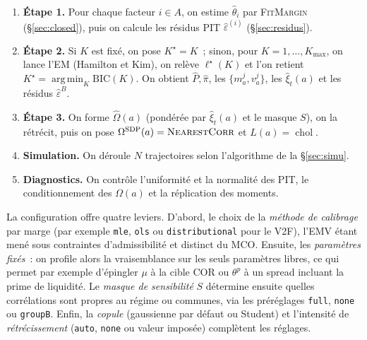 \documentclass[11pt,a4paper]{article}
\theoremstyle{definition}
\DeclareMathOperator{\chol}{chol}
\DeclareMathOperator*{\argmin}{arg\,min}
\newcommand{\eps}{\varepsilon}
\begin{document}
\begin{algobox}
\begin{enumerate}[leftmargin=1.5em,nosep]
\item \textbf{Étape 1.} Pour chaque facteur $i\in A$, on estime $\hat\theta_i$ par \textsc{FitMargin} (\S\ref{sec:closed}), puis on calcule les résidus PIT $\widehat\eps^{(i)}$ (\S\ref{sec:residus}).
\item \textbf{Étape 2.} Si $K$ est fixé, on pose $K^\star=K$~; sinon, pour $K=1,\dots,K_{\max}$, on lance l'EM (Hamilton et Kim), on relève $\ell^\star(K)$ et l'on retient $K^\star=\argmin_K\mathrm{BIC}(K)$. On obtient $\hat P,\hat\pi$, les $\{m^j_a,v^j_a\}$, les $\hat\xi_t(a)$ et les résidus $\widehat\eps^B$.
\item \textbf{Étape 3.} On forme $\widehat\Omega(a)$ (pondérée par $\hat\xi_t(a)$ et le masque $S$), on la rétrécit, puis on pose $\Omega^{\mathrm{SDP}}(a)=\textsc{NearestCorr}$ et $L(a)=\chol$.
\item \textbf{Simulation.} On déroule $N$ trajectoires selon l'algorithme de la \S\ref{sec:simu}.
\item \textbf{Diagnostics.} On contrôle l'uniformité et la normalité des PIT, le conditionnement des $\Omega(a)$ et la réplication des moments.
\end{enumerate}
\end{algobox}

\noindent La configuration offre quatre leviers. D'abord, le choix de la \emph{méthode de calibrage} par marge (par exemple \texttt{mle}, \texttt{ols} ou \texttt{distributional} pour le V2F), l'EMV étant mené sous contraintes d'admissibilité et distinct du MCO. Ensuite, les \emph{paramètres fixés}~: on profile alors la vraisemblance sur les seuls paramètres libres, ce qui permet par exemple d'épingler $\mu$ à la cible COR ou $\theta^p$ à un spread incluant la prime de liquidité. Le \emph{masque de sensibilité} $S$ détermine ensuite quelles corrélations sont propres au régime ou communes, via les préréglages \texttt{full}, \texttt{none} ou \texttt{groupB}. Enfin, la \emph{copule} (gaussienne par défaut ou Student) et l'intensité de \emph{rétrécissement} (\texttt{auto}, \texttt{none} ou valeur imposée) complètent les réglages.
\end{document}
